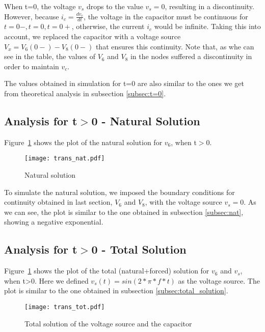When t=0, the voltage $v_s$ drops to the value $v_s=0$, resulting in a discontinuity. However, because $i_c=\frac{dv_c}{dt}$, the voltage in the capacitor must be continuous for $t=0-, t=0, t=0+$, otherwise, the current $i_c$ would be infinite. Taking this into account, we replaced the capacitor with a voltage source $V_x=V_6(0-)-V_8(0-)$ that ensures this continuity. Note that, as whe can see in the table, the values of $V_6$ and $V_8$ in the nodes suffered a discontinuity in order to maintain $v_c$. 

The values obtained in simulation for t=0 are also similar to the ones we get from theoretical analysis in subsection \ref{subsec:t=0}.

\newpage
\subsection{Analysis for t$>$0 - Natural Solution}

\par Figure~\ref{fig:trans_nat} shows the plot of the natural solution for $v_6$, when t$>$0.

\begin{figure}[H] \centering
\texttt{[image: trans\_nat.pdf]}
\caption{Natural solution}
\label{fig:trans_nat}
\end{figure}

To simulate the natural solution, we imposed the boundary conditions for continuity obtained in last section, $V_6$ and $V_8$, with the voltage source $v_s=0$. As we can see, the plot is similar to the one obtained in subsection \ref{subsec:nat}, showing a negative exponential.

\newpage
\subsection{Analysis for t$>$0 - Total Solution}

\par Figure~\ref{fig:trans_nat} shows the plot of the total (natural+forced) solution for $v_6$ and $v_s$, when t>0. Here we defined $v_s(t)=sin(2*\pi*f*t)$ as the voltage source. The plot is similar to the one obtained in subsection \ref{subsec:total_solution}.

\begin{figure}[H] \centering
\texttt{[image: trans\_tot.pdf]}
\caption{Total solution of the voltage source and the capacitor}
\label{fig:trans_tot}
\end{figure}

